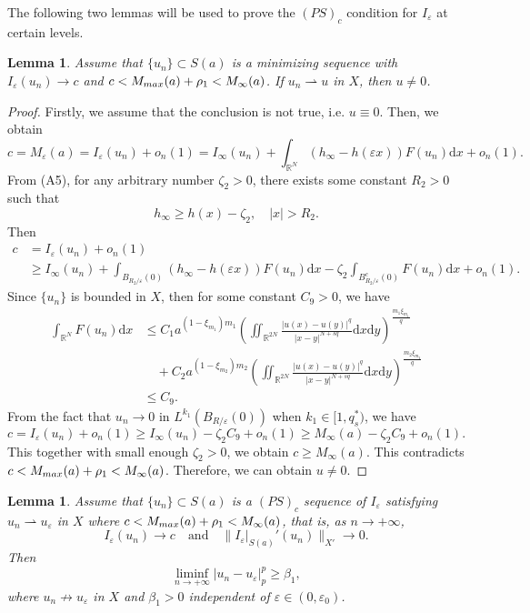 \documentclass[10pt,a4paper]{amsart}
\numberwithin{equation}{section}
\newtheorem{lemma}[theorem]{Lemma}
\begin{document}
The following two lemmas will be used to prove the $(PS)_c$ condition for 
$I_\varepsilon$ at certain levels.

\begin{lemma}\label{lem:3.2}
Assume that $\{u_n\}\subset S(a)$ is a minimizing sequence with 
$I_\varepsilon(u_n)\to c$ and $c < M_{\rm max}(a)+\rho_1 < M_{\infty}(a)$.
If $u_n\rightharpoonup u$ in $X$, then $u \neq  0$.
\end{lemma}

\begin{proof}
Firstly, we assume that the conclusion is not true, i.e. $u\equiv0$. 
Then, we obtain
$$
c=M_{\varepsilon}(a)=I_\varepsilon(u_n)+o_n(1)
=I_\infty(u_n)+\int_{\mathbb{R}^N}(h_\infty-h(\varepsilon x))F(u_n)\mathrm{d}x+o_n(1).
$$
From (A5), for any arbitrary number $\zeta_2>0$, there exists some constant $ R_2 > 0$ 
such that
$$
h_{\infty}\ge h(x)-\zeta_2,\quad|x|>R_2.
$$
Then
\begin{align*}
c&= I_\varepsilon(u_n)+o_n(1)\\
&\geq  I_\infty(u_n)+\int_{B_{R_2/\varepsilon}(0)}(h_\infty-
h(\varepsilon x))F(u_n)\mathrm{d}x-\zeta_2\int_{B_{R_2/\varepsilon}^{c}(0)}F(u_n)
\mathrm{d}x+o_n(1).
\end{align*}
Since $\{u_n\}$ is bounded in $X$, then for some constant $C_9 > 0$, we have
\begin{align*}
\int_{\mathbb{R}^N}F(u_n)\mathrm{d}x
&\le C_1a^{(1-\xi_{m_1})m_1}(\iint_{\mathbb{R}^{2N}}
 \frac{|u(x)-u(y)|^{q}}{|x-y|^{N+sq}}\mathrm{d}x\mathrm{d}y)^{\frac{m_1\xi_{m_1}}{q}}\\
&\quad +C_2a^{(1-\xi_{m_2})m_2}(\iint_{\mathbb{R}^{2N}}
 \frac{|u(x)-u(y)|^{q}}{|x-y|^{N+sq}}\mathrm{d}x\mathrm{d}y)^{\frac{m_2\xi_{m_2}}{q}}\\
&\le C_9.
\end{align*}
From the fact that $u_n\to 0$ in $L^{k_1}(B_{R/\varepsilon}(0))$ when 
$k_1\in[1,q_{s}^{*})$, we have
$$
c=I_\varepsilon(u_n)+o_n(1)\ge I_\infty(u_n)-\zeta_2 C_9+o_n(1)\ge M_\infty (a)
-\zeta_2 C_9+o_n(1).
$$
This together with small enough $\zeta_2> 0$, we obtain
$c\ge M_\infty (a)$.
This contradicts $c < M_{\rm max}(a) + \rho_1 < M_\infty(a)$. 
Therefore, we can obtain $u\neq 0$.
\end{proof}

\begin{lemma}\label{lem:3.3} 
Assume that $\{u_n\}\subset S(a)$  is a
$(PS)_c$ sequence of $I_\varepsilon$ satisfying $u_n\rightharpoonup u_\varepsilon$ 
in $X$ where $c < M_{\rm max}(a) + \rho_1 <M_{\infty}(a)$, that is, as $n\to+\infty$,
$$
I_\varepsilon(u_n)\to c \quad \text{and}\quad\|I_\varepsilon|_{S(a)}'(u_n)\|_{X'}\to 0.
$$
Then
$$
\liminf_{n\to+\infty}|u_n-u_\varepsilon|_p^{p}\ge \beta_1,
$$
where $u_n\not\to u_\varepsilon $ in $X$ and $\beta_1>0$ independent of 
$\varepsilon\in(0,\varepsilon_0)$.
\end{lemma}
\end{document}
